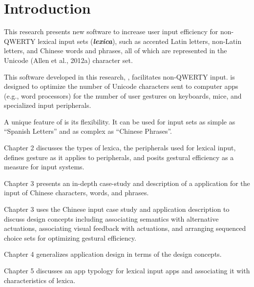 
\chapter{Introduction}\label{introduction}

This research presents new software to increase user input efficiency
for non-QWERTY lexical input sets (\emph{\textbf{lexica}}), such as
accented Latin letters, non-Latin letters, and Chinese words and
phrases, all of which are represented in the Unicode (Allen et al.,
2012a) character set.

This software developed in this research, \mulex,
facilitates non-QWERTY input. \mulex is designed to
optimize the number of Unicode characters sent to computer apps (e.g.,
word processors) for the number of user gestures on keyboards, mice, and
specialized input peripherals.

A unique feature of \mulex is its flexibility. It can be
used for input sets as simple as ``Spanish Letters'' and as complex as
``Chinese Phrases''.

Chapter 2 discusses the types of lexica, the peripherals used for
lexical input, defines gesture as it applies to peripherals, and posits
gestural efficiency as a measure for input systems.

Chapter 3 presents an in-depth case-study and description of a
\mulex application for the input of Chinese characters,
words, and phrases.

Chapter 3 uses the Chinese input case study and application description
to discuss \mulex design concepts including associating
semantics with alternative actuations, associating visual feedback with
actuations, and arranging sequenced choice sets for optimizing gestural
efficiency.

Chapter 4 generalizes application design in terms of the design
concepts.

Chapter 5 discusses an app typology for lexical input apps and
associating it with characteristics of lexica.


